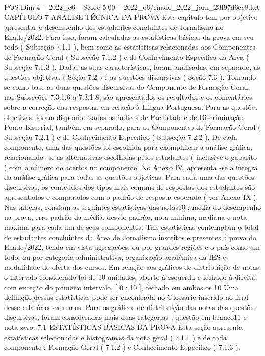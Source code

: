 \begin{textsample}{POS Dim 4 – 2022\_c6 – Score 5.00 – 2022\_c6/enade\_2022\_jorn\_23f97d6ee8.txt}  \label{ex:f4_pos_082}
CAPÍTULO 7 ANÁLISE TÉCNICA DA PROVA Este capítulo tem por objetivo apresentar o desempenho dos estudantes concluintes de Jornalismo no Enade/2022.
Para isso, foram calculadas as estatísticas básicas da prova em seu todo ( Subseção 7.1.1 ), bem como as estatísticas relacionadas aos Componentes de Formação Geral ( Subseção 7.1.2 ) e de Conhecimento Específico da Área ( Subseção 7.1.3 ).
Dadas as suas características, foram analisadas, em separado, as questões objetivas ( Seção 7.2 ) e as questões discursivas ( Seção 7.3 ).
Tomando -se como base as duas questões discursivas do Componente de Formação Geral, nas Subseções 7.3.1.6 a 7.3.1.8, são apresentados os resultados e os comentários sobre a correção das respostas em relação à Língua Portuguesa.
Para as questões objetivas, foram disponibilizados os índices de Facilidade e de Discriminação Ponto-Bisserial, também em separado, para os Componentes de Formação Geral ( Subseção 7.2.1 ) e de Conhecimento Específico ( Subseção 7.2.2 ).
De cada componente, uma das questões foi escolhida para exemplificar a análise gráfica, relacionando -se as alternativas escolhidas pelos estudantes ( inclusive o gabarito ) com o número de acertos no componente.
No Anexo IV, apresenta -se a íntegra da análise gráfica para todas as questões objetivas.
Para cada uma das questões discursivas, os conteúdos dos tipos mais comuns de respostas dos estudantes são apresentados e comparados com o padrão de resposta esperado ( ver Anexo IX ).
Nas tabelas, constam as seguintes estatísticas das notas10 : média do desempenho na prova, erro-padrão da média, desvio-padrão, nota mínima, mediana e nota máxima para cada um de seus componentes.
Tais estatísticas contemplam o total de estudantes concluintes da Área de Jornalismo inscritos e presentes à prova do Enade/2022, tendo em vista agregações, ou por grandes regiões e o país como um todo, ou por categoria administrativa, organização acadêmica da IES e modalidade de oferta dos cursos.
Em relação aos gráficos de distribuição de notas, o intervalo considerado foi de 10 unidades, aberto à esquerda e fechado à direita, com exceção do primeiro intervalo, [ 0 ; 10 ], fechado em ambos os 10 Uma definição dessas estatísticas pode ser encontrada no Glossário inserido no final desse relatório. extremos.
Para os gráficos de distribuição das notas das questões discursivas, foram consideradas mais duas categorias : questão em branco11 e nota zero. 7.1 ESTATÍSTICAS BÁSICAS DA PROVA Esta seção apresenta estatísticas selecionadas e histogramas da nota geral ( 7.1.1 ) e de cada componente : Formação Geral ( 7.1.2 ) e Conhecimento Específico ( 7.1.3 ).

\end{textsample}
